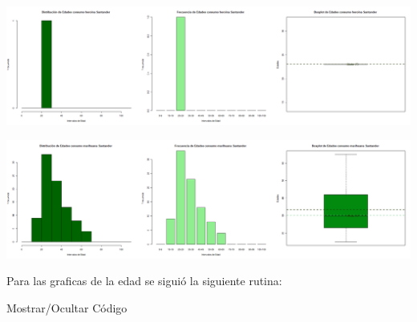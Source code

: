 \documentclass[
]{article}
\begin{document}
\includegraphics{images/heroina edad santander.png}

\includegraphics{images/marihuana edad santander.png}

Para las graficas de la edad se siguió la siguiente rutina:

Mostrar/Ocultar Código
\end{document}
